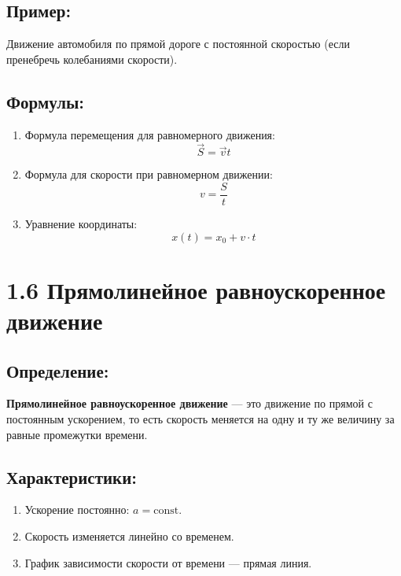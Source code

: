 \documentclass[a4paper,12pt]{article}
\begin{document}
\subsection*{Пример:}
\vspace{-3pt}
Движение автомобиля по прямой дороге с постоянной скоростью (если пренебречь колебаниями скорости).
\vspace{-9pt}
\subsection*{Формулы:}
\vspace{-3pt}
\begin{enumerate}
    \item Формула перемещения для равномерного движения:
    \vspace{-0.05em}
    $$ \vec{S} = \vec{v}t $$ 
    \item Формула для скорости при равномерном движении:
    \vspace{-0.05em}
    $$ v = \frac{S}{t} $$ 
    \item Уравнение координаты:
    \vspace{-0.05em}
    $$ x(t) = x_0 + v \cdot t $$ 
\end{enumerate}


\section*{1.6 Прямолинейное равноускоренное движение}
\vspace{-9pt}
\subsection*{Определение:}
\vspace{-3pt}
\textbf{Прямолинейное равноускоренное движение} — это движение по прямой с постоянным ускорением, то есть скорость меняется на одну и ту же величину за равные промежутки времени.
\vspace{-9pt}
\subsection*{Характеристики:}
\vspace{-3pt}
\begin{enumerate}[itemsep=0pt, topsep=0pt, parsep=3pt]
    \item Ускорение постоянно: $a = \text{const}$.
    \item Скорость изменяется линейно со временем.
    \item График зависимости скорости от времени — прямая линия.
\end{enumerate}
\vspace{-9pt}
\end{document}
